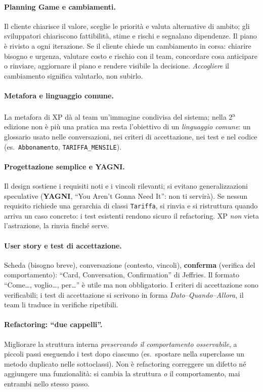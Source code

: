 \documentclass[a4paper,12pt]{article}
\begin{document}
\paragraph{Planning Game e cambiamenti.} Il cliente chiarisce il valore, sceglie le
priorità e valuta alternative di ambito; gli sviluppatori chiariscono fattibilità, stime e
rischi e segnalano dipendenze. Il piano è rivisto a ogni iterazione. Se il cliente chiede
un cambiamento in corsa: chiarire bisogno e urgenza, valutare costo e rischio con il team,
concordare cosa anticipare o rinviare, aggiornare il piano e rendere visibile la
decisione. \emph{Accogliere} il cambiamento significa valutarlo, non subirlo.

\paragraph{Metafora e linguaggio comune.} La metafora di XP dà al team un'immagine
condivisa del sistema; nella 2\textsuperscript{a} edizione non è più una pratica ma resta
l'obiettivo di un \emph{linguaggio comune}: un glossario usato nelle conversazioni, nei
criteri di accettazione, nei test e nel codice (es.\ \texttt{Abbonamento},
\texttt{TARIFFA\_MENSILE}).

\paragraph{Progettazione semplice e YAGNI.} Il design sostiene i requisiti noti e i vincoli
rilevanti; si evitano generalizzazioni speculative (\textbf{YAGNI}, ``You Aren't Gonna Need
It'': non ti servirà). Se nessun requisito richiede una gerarchia di classi \texttt{Tariffa},
si rinvia e si ristruttura quando arriva un caso concreto: i test esistenti rendono sicuro il
refactoring. XP \emph{non} vieta l'astrazione, la rinvia finché serve.

\paragraph{User story e test di accettazione.} Scheda (bisogno breve), conversazione
(contesto, vincoli), \textbf{conferma} (verifica del comportamento): ``Card, Conversation,
Confirmation'' di Jeffries. Il formato ``Come\dots, voglio\dots, per\dots'' è utile ma non
obbligatorio. I criteri di accettazione sono verificabili; i test di accettazione si
scrivono in forma \emph{Dato--Quando--Allora}, il team li traduce in verifiche ripetibili.

\paragraph{Refactoring: ``due cappelli''.} Migliorare la struttura interna \emph{preservando
il comportamento osservabile}, a piccoli passi eseguendo i test dopo ciascuno (es.\ spostare
nella superclasse un metodo duplicato nelle sottoclassi). Non è refactoring correggere un
difetto né aggiungere una funzionalità: si cambia la struttura \emph{o} il comportamento,
mai entrambi nello stesso passo.
\end{document}
